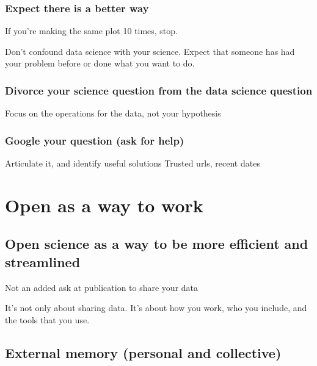 \documentclass[
  letterpaper,
  DIV=11,
  numbers=noendperiod]{scrreprt}
\begin{document}
\hypertarget{expect-there-is-a-better-way}{%
\subsubsection{Expect there is a better
way}\label{expect-there-is-a-better-way}}

If you're making the same plot 10 times, stop.

Don't confound data science with your science. Expect that someone has
had your problem before or done what you want to do.

\hypertarget{divorce-your-science-question-from-the-data-science-question}{%
\subsubsection{Divorce your science question from the data science
question}\label{divorce-your-science-question-from-the-data-science-question}}

Focus on the operations for the data, not your hypothesis

\hypertarget{google-your-question-ask-for-help}{%
\subsubsection{Google your question (ask for
help)}\label{google-your-question-ask-for-help}}

Articulate it, and identify useful solutions Trusted urls, recent dates

\hypertarget{open-as-a-way-to-work}{%
\section{Open as a way to work}\label{open-as-a-way-to-work}}

\hypertarget{open-science-as-a-way-to-be-more-efficient-and-streamlined}{%
\subsection{Open science as a way to be more efficient and
streamlined}\label{open-science-as-a-way-to-be-more-efficient-and-streamlined}}

Not an added ask at publication to share your data

It's not only about sharing data. It's about how you work, who you
include, and the tools that you use.

\hypertarget{external-memory-personal-and-collective}{%
\subsection{External memory (personal and
collective)}\label{external-memory-personal-and-collective}}
\end{document}
